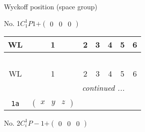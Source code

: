 \documentclass[fleqn,9pt,landscape]{jsarticle}
\begin{document}
\setcounter{MaxMatrixCols}{16}

\begin{center}
\LARGE
Wyckoff position (space group)
\end{center}
No. 1\quad$C_{1}^{1}$\quad$P1$\quad[ triclinic ]\quad$+\begin{pmatrix} 0 & 0 & 0 \end{pmatrix}$
\begin{center}
\renewcommand{\arraystretch}{1.2}
\begin{longtable}{ccccccc}
 \hline \hline
WL & 1 & 2 & 3 & 4 & 5 & 6 \\ \hline \endfirsthead

\multicolumn{6}{l}{\tablename\ \thetable{}} \\
 \hline \hline
WL & 1 & 2 & 3 & 4 & 5 & 6 \\ \hline \endhead

 \hline \hline
\multicolumn{6}{r}{\footnotesize\it continued ...} \\ \endfoot

 \hline \hline
\multicolumn{6}{r}{} \\ \endlastfoot

{\tt 1a} & $ \begin{pmatrix} x & y & z \end{pmatrix} $ \\
\end{longtable}
\end{center}
\newpage
No. 2\quad$C_{i}^{1}$\quad$P-1$\quad[ triclinic ]\quad$+\begin{pmatrix} 0 & 0 & 0 \end{pmatrix}$
\end{document}

